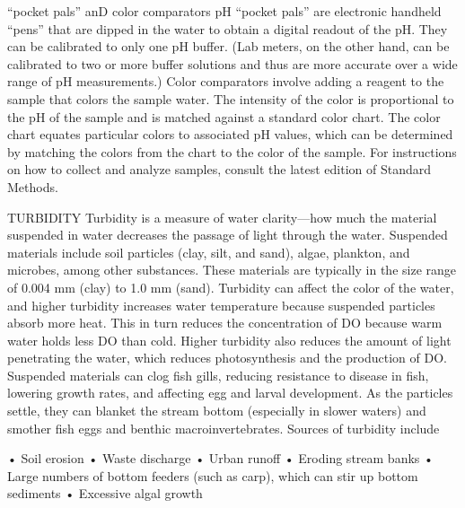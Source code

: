 \documentclass{article}
\begin{document}
``pocket pals'' anD color comparators pH ``pocket pals'' are electronic
handheld ``pens'' that are dipped in the water to obtain a digital
readout of the pH. They can be calibrated to only one pH buffer. (Lab
meters, on the other hand, can be calibrated to two or more buffer
solutions and thus are more accurate over a wide range of pH
measurements.) Color comparators involve adding a reagent to the sample
that colors the sample water. The intensity of the color is proportional
to the pH of the sample and is matched against a standard color chart.
The color chart equates particular colors to associated pH values, which
can be determined by matching the colors from the chart to the color of
the sample. For instructions on how to collect and analyze samples,
consult the latest edition of Standard Methods.

TURBIDITY Turbidity is a measure of water clarity---how much the
material suspended in water decreases the passage of light through the
water. Suspended materials include soil particles (clay, silt, and
sand), algae, plankton, and microbes, among other substances. These
materials are typically in the size range of 0.004 mm (clay) to 1.0 mm
(sand). Turbidity can affect the color of the water, and higher
turbidity increases water temperature because suspended particles absorb
more heat. This in turn reduces the concentration of DO because warm
water holds less DO than cold. Higher turbidity also reduces the amount
of light penetrating the water, which reduces photosynthesis and the
production of DO. Suspended materials can clog fish gills, reducing
resistance to disease in fish, lowering growth rates, and affecting egg
and larval development. As the particles settle, they can blanket the
stream bottom (especially in slower waters) and smother fish eggs and
benthic macroinvertebrates. Sources of turbidity include

• Soil erosion • Waste discharge • Urban runoff • Eroding stream banks •
Large numbers of bottom feeders (such as carp), which can stir up bottom
sediments • Excessive algal growth
\end{document}
